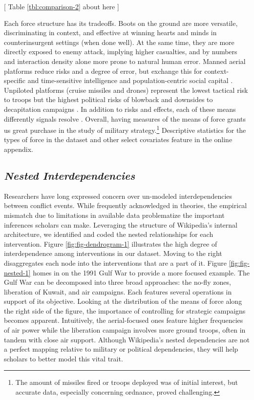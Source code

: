 \documentclass[fleqn,12pt]{article}
\begin{document}
\begin{center}
	[ Table \ref{tbl:comparison-2} about here ]
\end{center}

Each force structure has its tradeoffs. Boots on the ground are more versatile, discriminating in context, and effective at winning hearts and minds in counterinsurgent settings (when done well). At the same time, they are more directly exposed to enemy attack, implying higher casualties, and by numbers and interaction density alone more prone to natural human error. Manned aerial platforms reduce risks and a degree of error, but exchange this for context-specific and time-sensitive intelligence and population-centric social capital \citep{lyall_ragemachinesexplaining_2009}. Unpiloted platforms (cruise missiles and drones) represent the lowest tactical risk to troops but the highest political risks of blowback \citep{johnston_impactusdrone_2016} and downsides to decapitation campaigns \citep{price_targetingtopterrorists_2012}. In addition to risks and effects, each of these means differently signals resolve \citep{zegart_cheapfightscredible_2018}. Overall, having measures of the means of force grants us great purchase in the study of military strategy.\footnote{The amount of missiles fired or troops deployed was of initial interest, but accurate data, especially concerning ordnance, proved challenging.} Descriptive statistics for the types of force in the dataset and other select covariates feature in the online appendix.

\subsection*{\textit{Nested Interdependencies}}
Researchers have long expressed concern over un-modeled interdependencies between conflict events. While frequently acknowledged in theories, the empirical mismatch due to limitations in available data problematize the important inferences scholars can make. Leveraging the structure of Wikipedia’s internal architecture, we identified and coded the nested relationships for each intervention. Figure \ref{fig:fig-dendrogram-1} illustrates the high degree of interdependence among interventions in our dataset. Moving to the right disaggregates each node into the interventions that are a part of it. Figure \ref{fig:fig-nested-1} homes in on the 1991 Gulf War to provide a more focused example. The Gulf War can be decomposed into three broad approaches: the no-fly zones, liberation of Kuwait, and air campaigns. Each features several operations in support of its objective. Looking at the distribution of the means of force along the right side of the figure, the importance of controlling for strategic campaigns becomes apparent. Intuitively, the aerial-focused ones feature higher frequencies of air power while the liberation campaign involves more ground troops, often in tandem with close air support. Although Wikipedia’s nested dependencies are not a perfect mapping relative to military or political dependencies, they will help scholars to better model this vital trait. 
\end{document}

